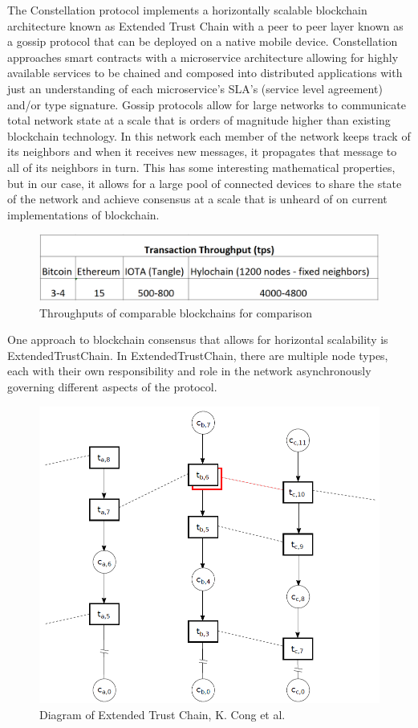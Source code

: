 \documentclass{article}
\begin{document}
The Constellation protocol implements a horizontally scalable blockchain architecture known as Extended Trust Chain with a peer to peer layer known as a gossip protocol that can be deployed on a native mobile device. Constellation approaches smart contracts with a microservice architecture allowing for highly available services to be chained and composed into distributed applications with just an understanding of each microservice's SLA's (service level agreement) and/or type signature.
Gossip protocols allow for large networks to communicate total network state at a scale that is orders of magnitude higher than existing blockchain technology. In this network each member of the network keeps track of its neighbors and when it receives new messages, it propagates that message to all of its neighbors in turn. This has some interesting mathematical properties, but in our case, it allows for a large pool of connected devices to share the state of the network and achieve consensus at a scale that is unheard of on current implementations of blockchain.

\begin{figure}[H]
\centering
\includegraphics[scale=0.30]{Throughput.png}
\caption{Throughputs of comparable blockchains for comparison}
\end{figure} 

One approach to blockchain consensus that allows for horizontal scalability is ExtendedTrustChain. In ExtendedTrustChain, there are multiple node types, each with their own responsibility and role in the network asynchronously governing different aspects of the protocol. 

\begin{figure}[H]
\centering
\includegraphics[scale=0.65]{kcong-extended-trust-chain.PNG}
\caption{Diagram of Extended Trust Chain, K. Cong et al.}
\end{figure} 
\end{document}
